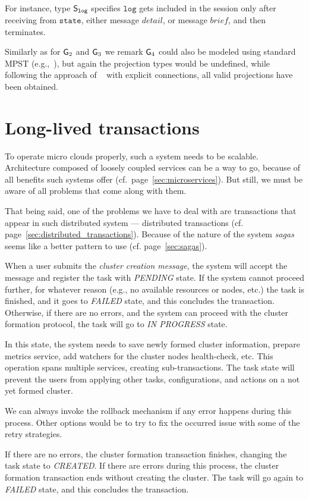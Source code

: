 \noindent
For instance, type ${\mathsf S}_\mathtt{log}$ specifies $\mathtt{log}$ gets included in the session only after receiving from $\mathtt{state}$, either message $\mathit{detail}$, or message $\mathit{brief}$, and then terminates. 

Similarly as for ${\sf G}_2$ and ${\sf G}_3$ we remark ${\sf G}_4$ could also be modeled using standard MPST (e.g.,~\cite{HondaYC08}), but again the projection types would be undefined, while following the approach of ~\cite{HuY17} with explicit connections, all valid projections have been obtained.
%
%
\section{Long-lived transactions}\label{sec:long_live_transactions}
%
To operate micro clouds properly, such a system needs to be scalable. Architecture composed of loosely coupled services can be a way to go, because of all benefits such systems offer (cf.~page~\ref{sec:microservices}). But still, we must be aware of all problems that come along with them.

That being said, one of the problems we have to deal with are transactions that appear in such distributed system --- distributed transactions (cf. page~\ref{sec:distributed_transactions}). Because of the nature of the system \emph{sagas} seems like a better pattern to use (cf. page~\ref{sec:sagas}).

When a user submits the \emph{cluster creation message}, the system will accept the message and register the task with \emph{PENDING} state. If the system cannot proceed further, for whatever reason (e.g., no available resources or nodes, etc.) the task is finished, and it goes to \emph{FAILED} state, and this concludes the transaction. Otherwise, if there are no errors, and the system can proceed with the cluster formation protocol, the task will go to \emph{IN PROGRESS} state.

In this state, the system needs to save newly formed cluster information, prepare metrics service, add watchers for the cluster nodes health-check, etc. This operation spans multiple services, creating sub-transactions. The task state will prevent the users from applying other tasks, configurations, and actions on a not yet formed cluster.

We can always invoke the rollback mechanism if any error happens during this process. Other options would be to try to fix the occurred issue with some of the retry strategies.

If there are no errors, the cluster formation transaction finishes, changing the task state to \emph{CREATED}. If there are errors during this process, the cluster formation transaction ends without creating the cluster. The task will go again to \emph{FAILED} state, and this concludes the transaction.

